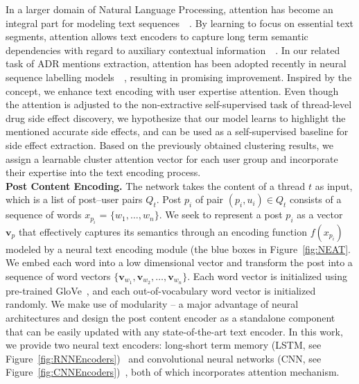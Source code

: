 \documentclass{bmcart}
\begin{document}
In a larger domain of Natural Language Processing, attention has become an integral part for modeling text sequences~\cite{luong2015effective}~\cite{vaswani2017attention}. By learning to focus on essential text segments, attention allows text encoders to capture long term semantic dependencies with regard to auxiliary contextual information~\cite{chen2016neural}~\cite{feng2019attention}. 
In our related task of ADR mentions extraction, attention has been adopted recently in neural sequence labelling models~\cite{ding2018attentive}~\cite{ramamoorthy2018attentive}, 
resulting in promising improvement. 
Inspired by the concept, we enhance text encoding with user expertise attention. Even though the attention is adjusted to the non-extractive self-supervised task of thread-level drug side effect discovery, we hypothesize that our model learns to highlight the mentioned accurate side effects, and can be used as a self-supervised baseline for side effect extraction. Based on the previously obtained clustering results, we assign a learnable cluster attention vector for each user group and incorporate their expertise into the text encoding process. \\

\textbf{Post Content Encoding.} The network takes the content of a
thread $t$ as input, which is a list of post--user pairs $Q_t$.  Post
$p_i$ of pair $\left(p_i, u_i\right)\in Q_t$ consists of a sequence of words $x_{p_i}$ = $\{w_1, \ldots, w_n\}$.
We seek to represent a post $p_{i}$ as a vector $\boldsymbol{v}_{p}$ 
that effectively captures its semantics through an encoding function $f(x_{p_i})$ modeled by a neural text encoding module (the blue boxes in Figure~\ref{fig:NEAT}. 
We embed each word into a low dimensional vector 
and transform the post into a sequence of word vectors
$\{\boldsymbol{v}_{w_1}, \boldsymbol{v}_{w_2},\ldots,
\boldsymbol{v}_{w_n}\}$. Each word vector is initialized using pre-trained GloVe~\cite{pennington2014glove}, and each out-of-vocabulary word vector is initialized randomly. We make use of modularity -- a major advantage of neural architectures and design the post content encoder as a standalone component that can be easily updated with any state-of-the-art text encoder. In this work, we provide two neural text encoders: 
long-short term memory (LSTM, see Figure~\ref{fig:RNNEncoders})~\cite{hochreiter1997long} 
and convolutional neural networks 
(CNN, see Figure~\ref{fig:CNNEncoders})~\cite{kim2014convolutional}, 
both of which incorporates attention mechanism.
\end{document}
